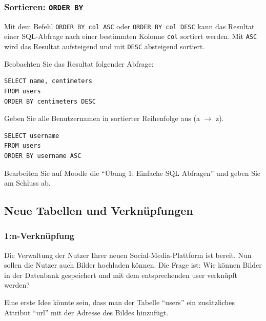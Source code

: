 \subsubsection*{Sortieren: \texorpdfstring{\lstinline|ORDER BY|}{ORDER BY}}

Mit dem Befehl \lstinline|ORDER BY col ASC| oder \lstinline|ORDER BY col DESC| kann das Resultat einer \gls{SQL}-Abfrage nach einer bestimmten Kolonne \lstinline|col| sortiert werden. Mit \lstinline|ASC| wird das Resultat aufsteigend und mit \lstinline|DESC| absteigend sortiert.

\begin{myexample}
Beobachten Sie das Resultat folgender Abfrage:

\begin{lstlisting}
SELECT name, centimeters
FROM users
ORDER BY centimeters DESC
\end{lstlisting}
\end{myexample}

\begin{myexercise}
  Geben Sie alle Benutzernamen in sortierter Reihenfolge aus (a $\rightarrow$ z).
  \begin{myanswer}
    \begin{lstlisting}
SELECT username
FROM users
ORDER BY username ASC
\end{lstlisting}
  \end{myanswer}
\end{myexercise}

\begin{myexercise}
  Bearbeiten Sie auf Moodle die \enquote{Übung 1: Einfache SQL Abfragen} und geben Sie am Schluss ab.
\end{myexercise}

\subsection{Neue Tabellen und Verknüpfungen}
\subsubsection{1:n-Verknüpfung}
Die Verwaltung der Nutzer Ihrer neuen Social-Media-Plattform ist bereit. Nun sollen die Nutzer auch Bilder hochladen können. Die Frage ist: Wie können Bilder in der Datenbank gespeichert und mit dem entsprechenden user verknüpft werden?

Eine erste Idee könnte sein, dass man der Tabelle \enquote{users} ein zusätzliches Attribut \enquote{url} mit der Adresse des Bildes hinzufügt.

